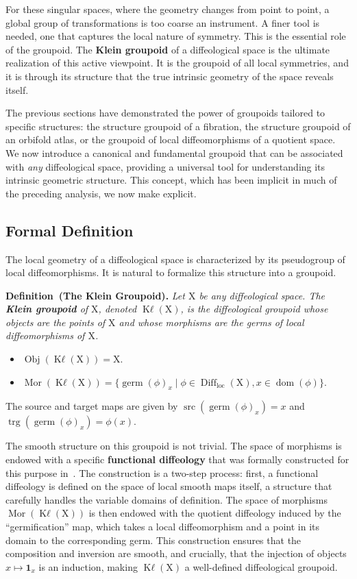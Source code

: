 \documentclass[10pt,reqno,letterpaper,twoside]{amsart}
\theoremstyle{article}
\newenvironment{definition}[1]%
{\noindent\textbf{Definition#1.} \it}%
{}
\def \K{\mathrm K}
\def \X{\mathrm X}
\DeclareMathOperator{\Diff}{Diff}
\DeclareMathOperator{\dom}{dom}
\DeclareMathOperator{\germ}{germ}
\DeclareMathOperator{\Kl}{{\K\ell}}
\newcommand{\id}{\mathbf 1}
\newcommand{\loc}{\mathrm{loc}}
\newcommand{\Obj}{\operatorname{Obj}}
\newcommand{\Mor}{\operatorname{Mor}}
\newcommand{\source}{\operatorname{src}}
\newcommand{\target}{\operatorname{trg}}
\begin{document}
  For these singular spaces,
  where the geometry changes from point to point,
  a global group of transformations is too coarse an instrument.
  A finer tool is needed,
  one that captures the local nature of symmetry.
  This is the essential role of the groupoid.
  The \textbf{Klein groupoid} of a diffeological space is the ultimate realization of this active viewpoint.
  It is the groupoid of all local symmetries,
  and it is through its structure that the true intrinsic geometry of the space reveals itself.
  
  The previous sections have demonstrated the power of groupoids tailored to specific structures:
  the structure groupoid of a fibration,
  the structure groupoid of an orbifold atlas,
  or the groupoid of local diffeomorphisms of a quotient space.
  We now introduce a canonical and fundamental groupoid that can be associated with \emph{any} diffeological space,
  providing a universal tool for understanding its intrinsic geometric structure.
  This concept,
  which has been implicit in much of the preceding analysis, we now make explicit.
  
  \subsection{Formal Definition}
  
  The local geometry of a diffeological space is characterized by its pseudogroup of local diffeomorphisms.
  It is natural to formalize this structure into a groupoid.
  
  \begin{definition}{~(The Klein Groupoid)}
    Let $\X$ be any diffeological space. The \textbf{Klein groupoid} of $\X$, denoted $\Kl(\X)$, is the diffeological groupoid whose objects are the points of $\X$ and whose morphisms are the germs of local diffeomorphisms of $\X$.
    \begin{itemize}
      \item $\Obj(\Kl(\X)) = \X$.
      \item $\Mor(\Kl(\X)) = \{ \germ(\phi)_x \mid \phi \in \Diff_\loc(\X), x \in \dom(\phi) \}$.
    \end{itemize}
    The source and target maps are given by $\source(\germ(\phi)_x) = x$ and $\target(\germ(\phi)_x) = \phi(x)$.
  \end{definition}
  
  The smooth structure on this groupoid is not trivial.
  The space of morphisms is endowed with a specific \textbf{functional diffeology} that was formally constructed for this purpose in~\cite{IZL18}.
  The construction is a two-step process:
  first,
  a functional diffeology is defined on the space of local smooth maps itself,
  a structure that carefully handles the variable domains of definition.
  The space of morphisms $\Mor(\Kl(\X))$ is then endowed with the quotient diffeology induced by the ``germification'' map,
  which takes a local diffeomorphism and a point in its domain to the corresponding germ.
  This construction ensures that the composition and inversion are smooth,
  and crucially,
  that the injection of objects $x \mapsto \id_x$ is an induction,
  making $\Kl(\X)$ a well-defined diffeological groupoid.
  
\end{document}
